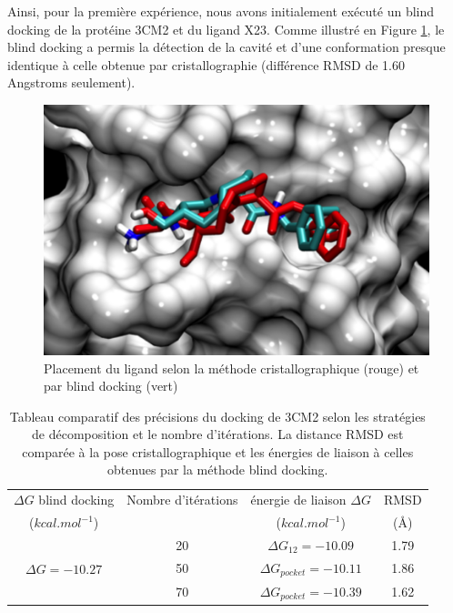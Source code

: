  Ainsi, pour la première expérience, nous avons initialement exécuté un blind docking de la protéine 3CM2 et du ligand X23. Comme illustré en  Figure \ref{fig:blind}, le blind docking a permis la détection de la cavité et d'une conformation presque identique à celle obtenue par cristallographie (différence RMSD de 1.60 Angstroms seulement).
 
 \begin{figure}[h]
 	\centering
 		\includegraphics[width=0.85\linewidth]{images/Romain/fig4-color} 
 		\caption{Placement du ligand selon la méthode cristallographique (rouge) et par blind docking (vert)}\label{fig:blind} %
 \end{figure}
 
 \begin{table}
 	\begin{center}
 		\caption{Tableau comparatif des précisions du docking de 3CM2 selon les stratégies de décomposition et le nombre d'itérations. La distance RMSD est comparée à la pose cristallographique et les énergies de liaison à celles obtenues par la méthode blind docking.}\label{tab:rmsd}
 		\begin{tabular}{|c|c|c|c|}
 			\hline 
 			$\Delta G$ blind docking & Nombre d'itérations & énergie de liaison $\Delta G$ & RMSD  \\ 
 			($kcal.mol^{-1}$)  &  & ($kcal.mol^{-1}$) &  (\AA{}) \\
 			\hline 
 			\multirow{3}{*}{$\Delta G = -10.27$}  & 20 & $\Delta G_{12} = -10.09$ & 1.79 \\ \cline{2-4}
 			& 50 & $\Delta G_{pocket} = -10.11$ & 1.86 \\ \cline{2-4}
 			& 70 & $\Delta G_{pocket} = -10.39$ & 1.62 \\ \cline{2-4}
 			\hline 
 		\end{tabular} 
 	\end{center}
 \end{table}
 
